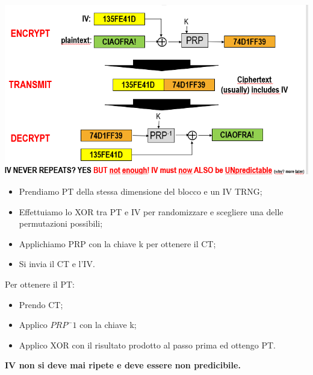 \documentclass{book}
\theoremstyle{remark}
\begin{document}
\begin{itemize}
	      \begin{center}
		      \includegraphics[scale=0.5]{IVblc.png}
	      \end{center}
	      \begin{itemize}
		      \item Prendiamo PT della stessa dimensione del blocco e un IV TRNG;\@
		      \item Effettuiamo lo XOR tra PT e IV per randomizzare e scegliere una delle permutazioni possibili;\@
		      \item Applichiamo PRP con la chiave k per ottenere il CT;\@
		      \item Si invia il CT e l'IV\@.
	      \end{itemize}
	      Per ottenere il PT:\begin{itemize}
		      \item Prendo CT;\@
		      \item Applico \(PRP^-1\) con la chiave k;\@
		      \item Applico XOR con il risultato prodotto al passo prima ed ottengo PT\@.
	      \end{itemize}
	      \textbf{IV non si deve mai ripete e deve essere non predicibile\@.}
\end{itemize}
\end{document}
